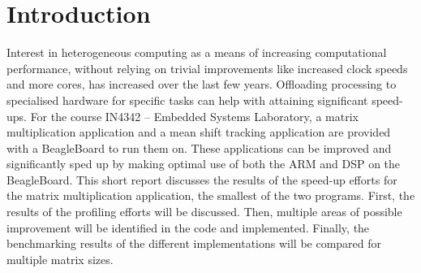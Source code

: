 \documentclass[final]{article}
\begin{document}
\section{Introduction}
Interest in heterogeneous computing as a means of increasing computational performance, without relying on trivial improvements like increased clock speeds and more cores, has increased over the last few years.
Offloading processing to specialised hardware for specific tasks can help with attaining significant speed-ups.
For the course IN4342 -- Embedded Systems Laboratory, a matrix multiplication application and a mean shift tracking application are provided with a BeagleBoard to run them on.
These applications can be improved and significantly sped up by making optimal use of both the ARM and DSP on the BeagleBoard.
This short report discusses the results of the speed-up efforts for the matrix multiplication application, the smallest of the two programs.
First, the results of the profiling efforts will be discussed.
Then, multiple areas of possible improvement will be identified in the code and implemented.
Finally, the benchmarking results of the different implementations will be compared for multiple matrix sizes.
\end{document}
